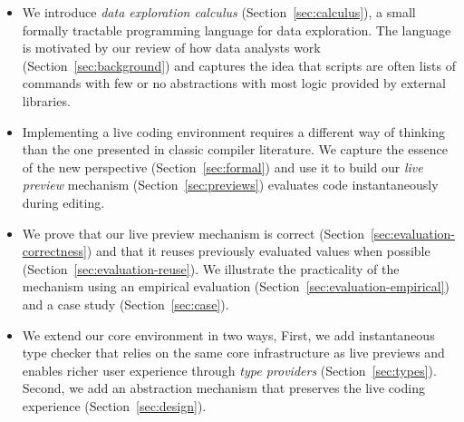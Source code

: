 \documentclass[acmsmall,anonymous,fleqn]{acmart}\settopmatter{printfolios=false,printccs=false,printacmref=false}
\theoremstyle{plain}
\theoremstyle{definition}
\begin{document}
\begin{itemize}[itemsep=3pt]
\item We introduce \emph{data exploration calculus} (Section~\ref{sec:calculus}), a small formally
  tractable programming language for data exploration. The language is motivated by our review
  of how data analysts work (Section~\ref{sec:background}) and captures the idea that scripts are
  often lists of commands with few or no abstractions with most logic provided by external libraries.

\item Implementing a live coding environment requires a different way of thinking than the one
  presented in classic compiler literature. We capture the essence of the new perspective
  (Section~\ref{sec:formal}) and use it to build our \emph{live preview} mechanism
  (Section~\ref{sec:previews}) evaluates code instantaneously during editing.

\item We prove that our live preview mechanism is correct (Section~\ref{sec:evaluation-correctness}) and that
  it reuses previously evaluated values when possible (Section~\ref{sec:evaluation-reuse}). We
  illustrate the practicality of the mechanism using an empirical evaluation
  (Section~\ref{sec:evaluation-empirical}) and a case study (Section~\ref{sec:case}).

\item We extend our core environment in two ways, First, we add instantaneous type checker
  that relies on the same core infrastructure as live previews and enables richer user experience
  through \emph{type providers} (Section~\ref{sec:types}). Second, we add an abstraction mechanism
  that preserves the live coding experience (Section~\ref{sec:design}).
\end{itemize}

\end{document}
